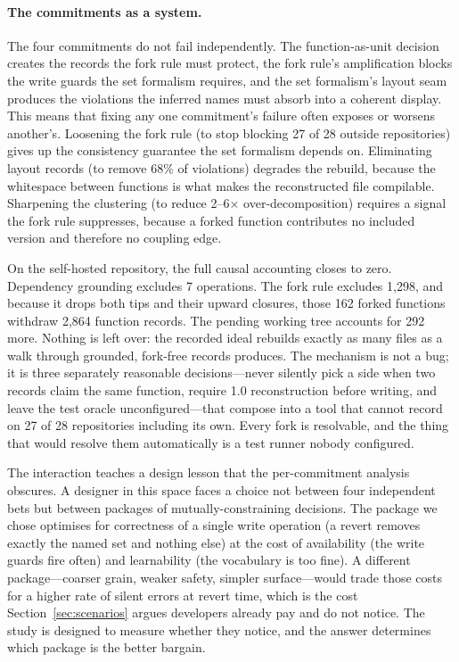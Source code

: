 \paragraph{The commitments as a system.}
The four commitments do not fail independently. The function-as-unit decision
creates the records the fork rule must protect, the fork rule's amplification
blocks the write guards the set formalism requires, and the set formalism's
layout seam produces the violations the inferred names must absorb into a
coherent display. This means that fixing any one commitment's failure often
exposes or worsens another's. Loosening the fork rule (to stop blocking 27 of 28
outside repositories) gives up the consistency guarantee the set formalism
depends on. Eliminating layout records (to remove 68\% of violations) degrades
the rebuild, because the whitespace between functions is what makes the
reconstructed file compilable. Sharpening the clustering (to reduce 2--6$\times$
over-decomposition) requires a signal the fork rule suppresses, because a forked
function contributes no included version and therefore no coupling edge.

On the self-hosted repository, the full causal accounting closes to zero.
Dependency grounding excludes 7 operations. The fork rule excludes 1{,}298, and
because it drops both tips and their upward closures, those 162 forked functions
withdraw 2{,}864 function records. The pending working tree accounts for 292
more. Nothing is left over: the recorded ideal rebuilds exactly as many files as
a walk through grounded, fork-free records produces. The mechanism is not a bug;
it is three separately reasonable decisions---never silently pick a side when two
records claim the same function, require 1.0 reconstruction before writing, and
leave the test oracle unconfigured---that compose into a tool that cannot record
on 27 of 28 repositories including its own. Every fork is resolvable, and the
thing that would resolve them automatically is a test runner nobody configured.

The interaction teaches a design lesson that the per-commitment analysis
obscures. A designer in this space faces a choice not between four independent
bets but between packages of mutually-constraining decisions. The package we
chose optimises for correctness of a single write operation (a revert removes
exactly the named set and nothing else) at the cost of availability (the write
guards fire often) and learnability (the vocabulary is too fine). A different
package---coarser grain, weaker safety, simpler surface---would trade those costs
for a higher rate of silent errors at revert time, which is the cost
Section~\ref{sec:scenarios} argues developers already pay and do not notice. The
study is designed to measure whether they notice, and the answer determines which
package is the better bargain.

